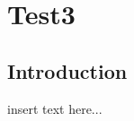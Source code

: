 \graphicspath{{chapt_dutch/}{intro/}{chapt2/}{chapt3/}{chapt4/}{chapt5/}{chapt6/}{chapt7/}}

\renewcommand\evenpagerightmark{{\scshape\small Appendix C}}
\renewcommand\oddpageleftmark{{\scshape\small Test3}}

\renewcommand{\bibname}{References}

\hyphenation{}

\chapter[Test3]%
{Test3}\label{app3}

\section{Introduction}
insert text here...

\clearpage{\pagestyle{empty}\cleardoublepage}
